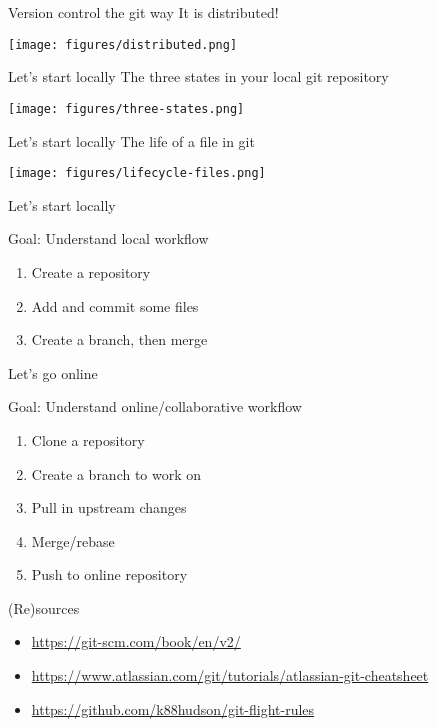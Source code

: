\documentclass[presentation,aspectratio=1610]{beamer}
\begin{document}
\begin{frame}[label={sec:org60d87f7}]{Version control the git way}
It is \alert{distributed}!

\begin{center}
\texttt{[image: figures/distributed.png]}
\end{center}
\end{frame}


\begin{frame}[label={sec:org64bc9ec}]{Let's start locally}
The three states in your local \alert{git} repository

\begin{center}
\texttt{[image: figures/three-states.png]}
\end{center}
\end{frame}
\begin{frame}[label={sec:org737575c}]{Let's start locally}
The life of a file in \alert{git}

\begin{center}
\texttt{[image: figures/lifecycle-files.png]}
\end{center}
\end{frame}
\begin{frame}[label={sec:org61e3195}]{Let's start locally}
\begin{block}{Goal: Understand local workflow}
\begin{enumerate}
\item Create a repository
\item Add and commit some files
\item Create a branch, then merge
\end{enumerate}
\end{block}
\end{frame}


\begin{frame}[label={sec:orgc6ada8a}]{Let's go online}
\begin{block}{Goal: Understand online/collaborative workflow}
\begin{enumerate}
\item Clone a repository
\item Create a branch to work on
\item Pull in upstream changes
\item Merge/rebase
\item Push to online repository
\end{enumerate}
\end{block}
\end{frame}

\begin{frame}[label={sec:orgff70be7}]{(Re)sources}
\begin{itemize}
\item \url{https://git-scm.com/book/en/v2/}
\item \url{https://www.atlassian.com/git/tutorials/atlassian-git-cheatsheet}
\item \url{https://github.com/k88hudson/git-flight-rules}
\end{itemize}
\end{frame}
\end{document}
